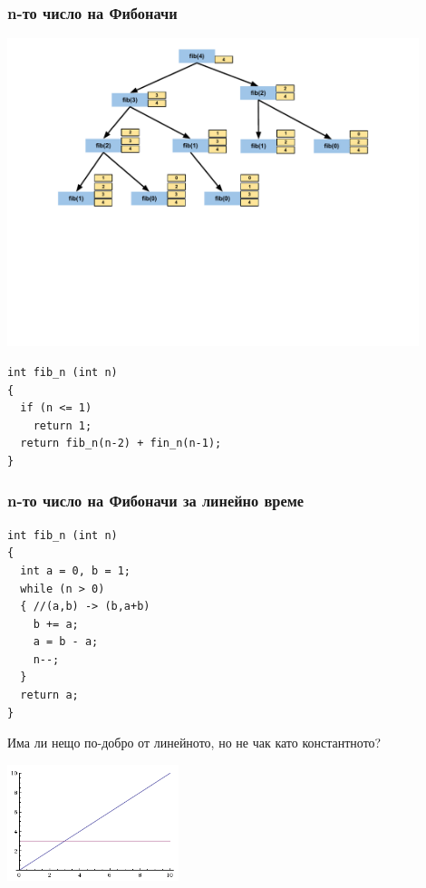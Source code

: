 \documentclass{beamer}
\begin{document}
\begin{frame}[fragile]
\frametitle{n-то число на Фибоначи}

\includegraphics[width=12cm]{images/fib_stack}

\vspace{-100px}

\begin{flushleft}
\begin{lstlisting}
int fib_n (int n)
{
  if (n <= 1)
    return 1;
  return fib_n(n-2) + fin_n(n-1);
}
\end{lstlisting}  
\end{flushleft}


\end{frame}


\begin{frame}[fragile]
\frametitle{n-то число на Фибоначи за линейно време}


\begin{flushleft}
\begin{lstlisting}
int fib_n (int n)
{
  int a = 0, b = 1;
  while (n > 0)
  { //(a,b) -> (b,a+b)
    b += a; 
    a = b - a;
    n--;
  }
  return a;
}
\end{lstlisting}  
\end{flushleft}


\end{frame}


\begin{frame}
\centerline{Има ли нещо по-добро от линейното, но не чак като константното?}

\begin{center}
  \includegraphics[width=5cm]{images/linearandconst}
\end{center}
\end{frame}
\end{document}
